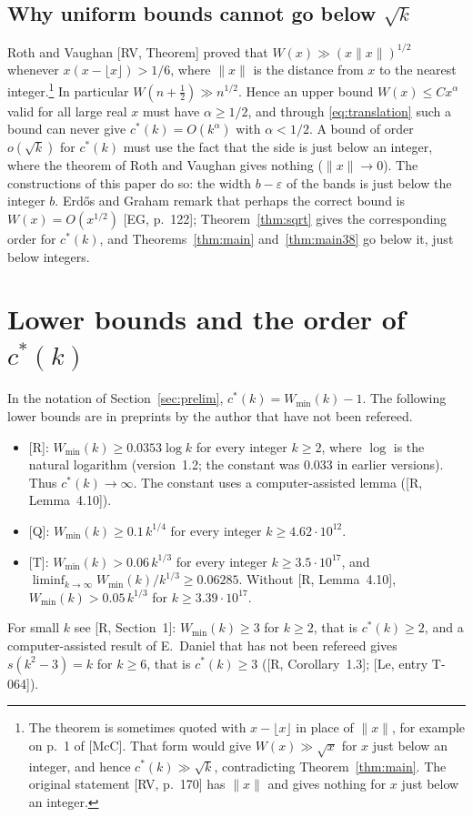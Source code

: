 \documentclass[11pt]{amsart}
\newcommand{\cs}{c^{*}}
\newcommand{\Wmin}{W_{\min}}
\theoremstyle{definition}
\theoremstyle{remark}
\numberwithin{equation}{section}
\begin{document}
\subsection{Why uniform bounds cannot go below \texorpdfstring{$\sqrt k$}{sqrt k}}\label{ssec:structural}
Roth and Vaughan [RV, Theorem] proved that $W(x)\gg(x\|x\|)^{1/2}$ whenever $x(x-\lfloor x\rfloor)>1/6$, where $\|x\|$ is
the distance from $x$ to the nearest integer.\footnote{The theorem is sometimes quoted with $x-\lfloor x\rfloor$ in
place of $\|x\|$, for example on p.~1 of [McC]. That form would give $W(x)\gg\sqrt x$ for $x$ just below an integer, and
hence $\cs(k)\gg\sqrt k$, contradicting Theorem~\ref{thm:main}. The original statement [RV, p.~170] has $\|x\|$ and
gives nothing for $x$ just below an integer.} In particular $W(n+\frac12)\gg n^{1/2}$. Hence an upper bound
$W(x)\le Cx^{\alpha}$ valid for all large real $x$ must have $\alpha\ge1/2$, and through \eqref{eq:translation} such a
bound can never give $\cs(k)=O(k^{\alpha})$ with $\alpha<1/2$. A bound of order $o(\sqrt k)$ for $\cs(k)$ must use the
fact that the side is just below an integer, where the theorem of Roth and Vaughan gives nothing ($\|x\|\to0$). The
constructions of this paper do so: the width $b-\varepsilon$ of the bands is just below the integer $b$. Erd\H{o}s and
Graham remark that perhaps the correct bound is $W(x)=O(x^{1/2})$ [EG, p.~122]; Theorem~\ref{thm:sqrt} gives the
corresponding order for $\cs(k)$, and Theorems~\ref{thm:main} and~\ref{thm:main38} go below it, just below integers.

\section{Lower bounds and the order of \texorpdfstring{$\cs(k)$}{c*(k)}}\label{sec:lower}

In the notation of Section~\ref{sec:prelim}, $\cs(k)=\Wmin(k)-1$. The following lower bounds are in preprints by the
author that have not been refereed.
\begin{itemize}
\item {[R]}: $\Wmin(k)\ge0.0353\log k$ for every integer $k\ge2$, where $\log$ is the natural logarithm (version~1.2;
the constant was $0.033$ in earlier versions). Thus $\cs(k)\to\infty$. The constant uses a computer-assisted lemma
([R, Lemma~4.10]).
\item {[Q]}: $\Wmin(k)\ge0.1\,k^{1/4}$ for every integer $k\ge4.62\cdot10^{12}$.
\item {[T]}: $\Wmin(k)>0.06\,k^{1/3}$ for every integer $k\ge3.5\cdot10^{17}$, and
$\liminf_{k\to\infty}\Wmin(k)/k^{1/3}\ge0.06285$. Without [R, Lemma~4.10], $\Wmin(k)>0.05\,k^{1/3}$ for
$k\ge3.39\cdot10^{17}$.
\end{itemize}
For small $k$ see [R, Section~1]: $\Wmin(k)\ge3$ for $k\ge2$, that is $\cs(k)\ge2$, and a computer-assisted result of
E.~Daniel that has not been refereed gives $s(k^2-3)=k$ for $k\ge6$, that is $\cs(k)\ge3$ ([R, Corollary~1.3];
[Le, entry T-064]).
\end{document}
